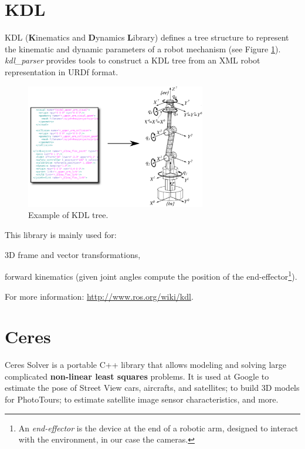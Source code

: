 \section{KDL}
\label{sec:KDL}

KDL (\textbf{K}inematics and \textbf{D}ynamics \textbf{L}ibrary) defines a tree structure to represent the kinematic and dynamic parameters of a robot mechanism (see Figure \ref{fig:KDL}). \textit{kdl\_parser} provides tools to construct a KDL tree from an XML robot representation in URDf format.

\begin{figure}[!htbp]
 \centering
 \includegraphics[width=0.7\textwidth]{images/KDL02.png}
 \caption{Example of KDL tree.}
 \label{fig:KDL}
\end{figure}

This library is mainly used for:
\begin{itemize*}
 \item 3D frame and vector transformations,
 \item forward kinematics (given joint angles compute the position of the end-effector\footnote{An \textit{end-effector} is the device at the end of a robotic arm, designed to interact with the environment, in our case the cameras.}).
\end{itemize*}


For more information: \url{http://www.ros.org/wiki/kdl}.

\section{Ceres}
\label{sec:ceres}

Ceres Solver \cite{ceres} is a portable C++ library that allows modeling and solving large complicated \textbf{non-linear least squares} problems. It is used at Google to estimate the pose of Street View cars, aircrafts, and satellites; to build 3D models for PhotoTours; to estimate satellite image sensor characteristics, and more.

